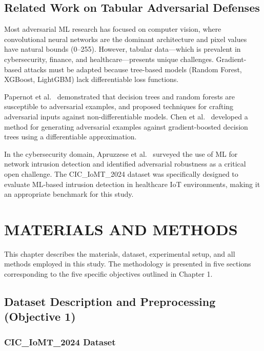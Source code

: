 \documentclass[12pt,a4paper,oneside]{report}
\begin{document}
\section{Related Work on Tabular Adversarial Defenses}

Most adversarial ML research has focused on computer vision, where convolutional neural networks are the dominant architecture and pixel values have natural bounds (0--255). However, tabular data---which is prevalent in cybersecurity, finance, and healthcare---presents unique challenges. Gradient-based attacks must be adapted because tree-based models (Random Forest, XGBoost, LightGBM) lack differentiable loss functions.

Papernot et al.~\cite{papernot2016limitations} demonstrated that decision trees and random forests are susceptible to adversarial examples, and proposed techniques for crafting adversarial inputs against non-differentiable models. Chen et al.~\cite{chen2019efficient} developed a method for generating adversarial examples against gradient-boosted decision trees using a differentiable approximation.

In the cybersecurity domain, Apruzzese et al.~\cite{apruzzese2020machine} surveyed the use of ML for network intrusion detection and identified adversarial robustness as a critical open challenge. The CIC\_IoMT\_2024 dataset was specifically designed to evaluate ML-based intrusion detection in healthcare IoT environments, making it an appropriate benchmark for this study.


\chapter{MATERIALS AND METHODS}

This chapter describes the materials, dataset, experimental setup, and all methods employed in this study. The methodology is presented in five sections corresponding to the five specific objectives outlined in Chapter 1.

\section{Dataset Description and Preprocessing (Objective 1)}

\subsection{CIC\_IoMT\_2024 Dataset}
\end{document}
